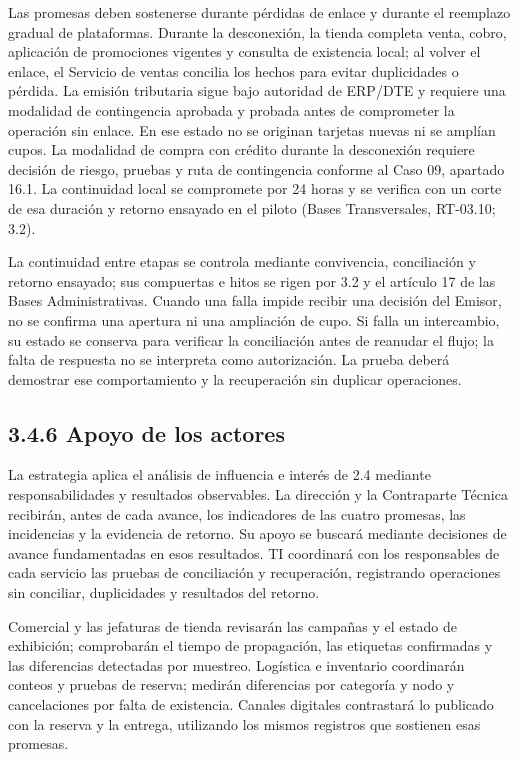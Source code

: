 \documentclass[11pt]{article}
\begin{document}
{Las promesas deben sostenerse durante pérdidas de enlace y durante el reemplazo gradual de plataformas. Durante la desconexión, la tienda completa venta, cobro, aplicación de promociones vigentes y consulta de existencia local; al volver el enlace, el Servicio de ventas concilia los hechos para evitar duplicidades o pérdida. La emisión tributaria sigue bajo autoridad de ERP/DTE y requiere una modalidad de contingencia aprobada y probada antes de comprometer la operación sin enlace. En ese estado no se originan tarjetas nuevas ni se amplían cupos. La modalidad de compra con crédito durante la desconexión requiere decisión de riesgo, pruebas y ruta de contingencia conforme al Caso 09, apartado 16.1. La continuidad local se compromete por 24 horas y se verifica con un corte de esa duración y retorno ensayado en el piloto (Bases Transversales, RT-03.10; 3.2).}

{La continuidad entre etapas se controla mediante convivencia, conciliación y retorno ensayado; sus compuertas e hitos se rigen por 3.2 y el artículo 17 de las Bases Administrativas. Cuando una falla impide recibir una decisión del Emisor, no se confirma una apertura ni una ampliación de cupo. Si falla un intercambio, su estado se conserva para verificar la conciliación antes de reanudar el flujo; la falta de respuesta no se interpreta como autorización. La prueba deberá demostrar ese comportamiento y la recuperación sin duplicar operaciones.}

\subsection{3.4.6 Apoyo de los actores}

{La estrategia aplica el análisis de influencia e interés de 2.4 mediante responsabilidades y resultados observables. La dirección y la Contraparte Técnica recibirán, antes de cada avance, los indicadores de las cuatro promesas, las incidencias y la evidencia de retorno. Su apoyo se buscará mediante decisiones de avance fundamentadas en esos resultados. TI coordinará con los responsables de cada servicio las pruebas de conciliación y recuperación, registrando operaciones sin conciliar, duplicidades y resultados del retorno.}

{Comercial y las jefaturas de tienda revisarán las campañas y el estado de exhibición; comprobarán el tiempo de propagación, las etiquetas confirmadas y las diferencias detectadas por muestreo. Logística e inventario coordinarán conteos y pruebas de reserva; medirán diferencias por categoría y nodo y cancelaciones por falta de existencia. Canales digitales contrastará lo publicado con la reserva y la entrega, utilizando los mismos registros que sostienen esas promesas.}
\end{document}
